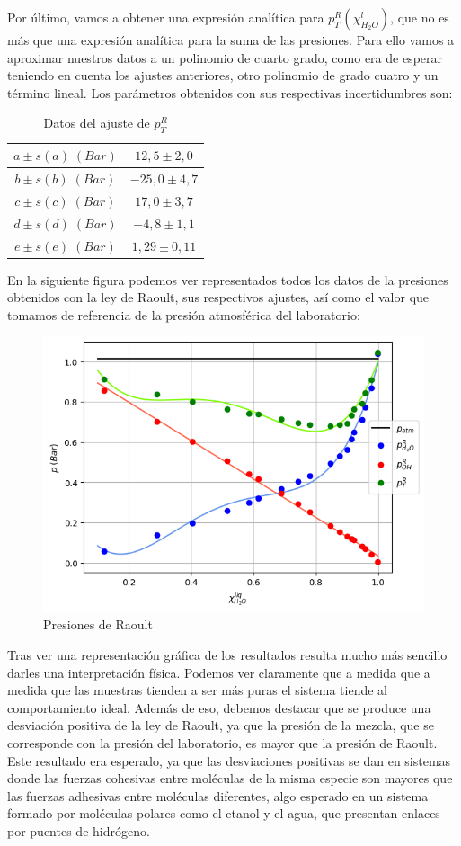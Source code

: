 \documentclass[a4paper,12pt,titlepage]{article}
\begin{document}
Por último, vamos a obtener una expresión analítica para $p_T^R(\chi_{H_2O}^l)$, que no es más que una expresión analítica para la suma de las presiones. Para ello vamos a aproximar nuestros datos a un polinomio de cuarto grado, como era de esperar teniendo en cuenta los ajustes anteriores, otro polinomio de grado cuatro y un término lineal. Los parámetros obtenidos con sus respectivas incertidumbres son:

\begin{table}[h!]
    \centering
    \begin{tabular}{|c|c|}
    \hline
    $a \pm s(a) \;(Bar)$ &  $12,5 \pm 2,0$\\ \hline
    $b\pm s(b) \; (Bar)$ & $-25,0 \pm 4,7$ \\ \hline
    $c \pm s(c) \; (Bar)$ & $17,0 \pm 3,7$\\ \hline
    $d \pm s(d) \; (Bar)$ & $-4,8 \pm 1,1$ \\ \hline
    $e \pm s(e) \; (Bar)$ & $1,29 \pm 0,11$ \\ \hline
    \end{tabular}
    \caption{Datos del ajuste de $p^R_{T}$}
    \label{tab:my_label}
\end{table}

En la siguiente figura podemos ver representados todos los datos de la presiones obtenidos con la ley de Raoult, sus respectivos ajustes, así como el valor que tomamos de referencia de la presión atmosférica del laboratorio:

\begin{figure}[h!]
    \centering
    \includegraphics[width=0.75\linewidth]{ELV binario/raoult.png}
    \caption{Presiones de Raoult}
    \label{fig:enter-label}
\end{figure}

Tras ver una representación gráfica de los resultados resulta mucho más sencillo darles una interpretación física. Podemos ver claramente que a medida que a medida que las muestras tienden a ser más puras el sistema tiende al comportamiento ideal. Además de eso, debemos destacar que se produce una desviación positiva de la ley de Raoult, ya que la presión de la mezcla, que se corresponde con la presión del laboratorio, es mayor que la presión de Raoult. Este resultado era esperado, ya que las desviaciones positivas se dan en sistemas donde las fuerzas cohesivas entre moléculas de la misma especie son mayores que las fuerzas adhesivas entre moléculas diferentes, algo esperado en un sistema formado por moléculas polares como el etanol y el agua, que presentan enlaces por puentes de hidrógeno.
\end{document}
